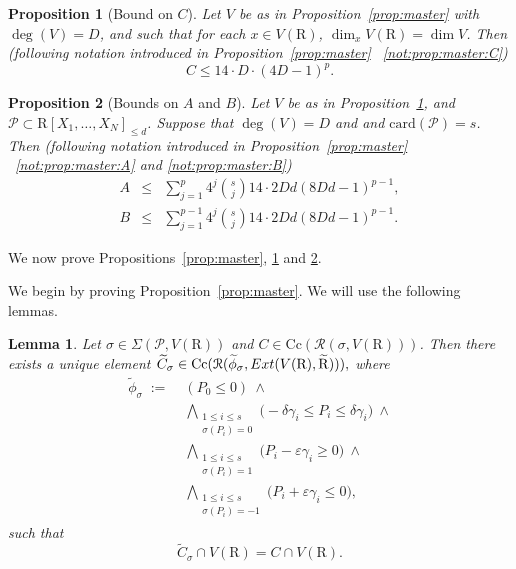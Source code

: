 \documentclass[10pt]{amsart}
\newtheorem{lemma}{Lemma}[section]
\newtheorem{proposition}{Proposition}[section]
\theoremstyle{definition}
\theoremstyle{remark}
\numberwithin{equation}{section}
\newcommand {\R} {\mathrm{R}}
\newcommand {\RR} {{\mathcal R}}
\newcommand {\E} {{\rm Ext}}
\newcommand{\card}{\mathrm{card}}
\newcommand{\Cc}{\mathrm{Cc}}
\begin{document}
\begin{proposition}[Bound on $C$]
\label{prop:master:C}
Let $V$ be as in Proposition~\ref{prop:master} with $\deg(V) = D$,
and such that for each $x \in V(\R)$,  $\dim_x V(\R) = \dim V$. Then
(following notation introduced in Proposition~\ref{prop:master} ~\eqref{not:prop:master:C})
\[
C \leq 14 \cdot D \cdot (4D-1)^{p}.
\]
\end{proposition}

\begin{proposition} [Bounds on $A$ and $B$]
\label{prop:master:AB}
    Let $V$ be as in Proposition~\ref{prop:master:C}, and
    $\mathcal{P} \subset \R[X_1,\ldots,X_N]_{\leq d}$.
    Suppose that $\deg(V) = D$ and and $\card(\mathcal{P}) = s$.
    Then 
    (following notation introduced in Proposition~\ref{prop:master} ~\eqref{not:prop:master:A} and \eqref{not:prop:master:B})
    \begin{eqnarray*}
        A & \leq & \sum_{j=1}^{p} 4^j \binom{s}{j} 14 \cdot 2Dd(8Dd -1)^{p-1}, \\
        B &
        \leq & \sum_{j=1}^{p-1} 4^j \binom{s}{j} 14 \cdot 2Dd(8Dd -1)^{p-1}.
    \end{eqnarray*}
\end{proposition}


We now prove Propositions~\ref{prop:master}, \ref{prop:master:C} and
\ref{prop:master:AB}.

We begin by proving Proposition~\ref{prop:master}.
We will use the following lemmas.

\begin{lemma}
\label{lem:main:ordered:4}
Let $\sigma \in \Sigma(\mathcal{P},V(\R))$ and $C
\in \Cc(\RR(\sigma,V(\R)))$.
Then there exists a unique element
$\widetilde{C}_\sigma \in \Cc(\RR(\widetilde{\phi}_\sigma,\E(V(\R),\widetilde{\R}))),
$
where 
\begin{align*}
\widetilde\phi_\sigma \;:=\;& (P_0\le 0)\ \wedge \\
&\bigwedge_{\substack{1\le i\le s\\ \sigma(P_i)=0}}
\bigl(-\delta\gamma_i \le P_i \le \delta\gamma_i\bigr)\ \wedge \\
&\bigwedge_{\substack{1\le i\le s\\ \sigma(P_i)=1}}
\bigl(P_i-\varepsilon\gamma_i \ge 0\bigr)\ \wedge \\
&\bigwedge_{\substack{1\le i\le s\\ \sigma(P_i)=-1}}
\bigl(P_i+\varepsilon\gamma_i \le 0\bigr),
\end{align*}
such that 
\[
\widetilde{C}_\sigma \cap V(\R) = C \cap V(\R).
\]
\end{lemma}
\end{document}

